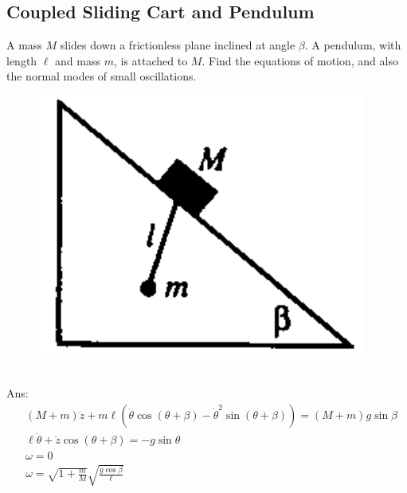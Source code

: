 \documentclass{article}
\begin{document}
\subsection{Coupled Sliding Cart and Pendulum}
A mass $M$ slides down a frictionless plane inclined at angle $\beta$. A pendulum, with length $\ell$ and mass $m$, is attached to $M$. Find the equations of motion, and also the normal modes of small oscillations. \\
\begin{figure}[h]
    \centering
\includegraphics[width=0.4\linewidth]{images/slidingcartpendulum.png}
\end{figure}\\
Ans: 
\begin{align}
& (M+m) \ddot{z}+m \ell\left(\ddot{\theta} \cos (\theta+\beta)-\dot{\theta}^2 \sin (\theta+\beta)\right)=(M+m) g \sin \beta \\ 
& \ell \ddot{\theta}+\ddot{z} \cos (\theta+\beta)=-g \sin \theta \\ 
& \omega=0 \\
& \omega=\sqrt{1+\frac{m}{M}} \sqrt{\frac{g \cos \beta}{\ell}} 
\end{align}
\end{document}
